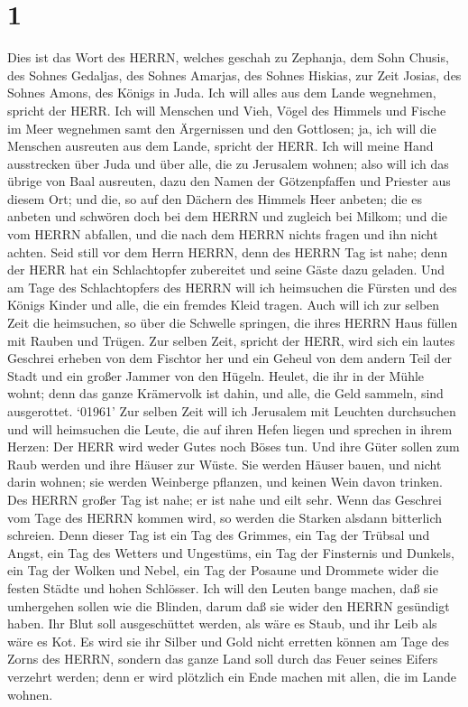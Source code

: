 \hypertarget{section}{%
\section{1}\label{section}}

 Dies ist das Wort des HERRN, welches geschah zu Zephanja,
dem Sohn Chusis, des Sohnes Gedaljas, des Sohnes Amarjas, des Sohnes
Hiskias, zur Zeit Josias, des Sohnes Amons, des Königs in Juda.
 Ich will alles aus dem Lande wegnehmen, spricht der HERR.
 Ich will Menschen und Vieh, Vögel des Himmels und Fische im
Meer wegnehmen samt den Ärgernissen und den Gottlosen; ja, ich will die
Menschen ausreuten aus dem Lande, spricht der HERR.  Ich
will meine Hand ausstrecken über Juda und über alle, die zu Jerusalem
wohnen; also will ich das übrige von Baal ausreuten, dazu den Namen der
Götzenpfaffen und Priester aus diesem Ort;  und die, so auf
den Dächern des Himmels Heer anbeten; die es anbeten und schwören doch
bei dem HERRN und zugleich bei Milkom;  und die vom HERRN
abfallen, und die nach dem HERRN nichts fragen und ihn nicht achten.
 Seid still vor dem Herrn HERRN, denn des HERRN Tag ist
nahe; denn der HERR hat ein Schlachtopfer zubereitet und seine Gäste
dazu geladen.  Und am Tage des Schlachtopfers des HERRN will
ich heimsuchen die Fürsten und des Königs Kinder und alle, die ein
fremdes Kleid tragen.  Auch will ich zur selben Zeit die
heimsuchen, so über die Schwelle springen, die ihres HERRN Haus füllen
mit Rauben und Trügen.  Zur selben Zeit, spricht der HERR,
wird sich ein lautes Geschrei erheben von dem Fischtor her und ein
Geheul von dem andern Teil der Stadt und ein großer Jammer von den
Hügeln.  Heulet, die ihr in der Mühle wohnt; denn das ganze
Krämervolk ist dahin, und alle, die Geld sammeln, sind ausgerottet.
 `01961' Zur selben Zeit will ich Jerusalem mit Leuchten
durchsuchen und will heimsuchen die Leute, die auf ihren Hefen liegen
und sprechen in ihrem Herzen: Der HERR wird weder Gutes noch Böses tun.
 Und ihre Güter sollen zum Raub werden und ihre Häuser zur
Wüste. Sie werden Häuser bauen, und nicht darin wohnen; sie werden
Weinberge pflanzen, und keinen Wein davon trinken.  Des
HERRN großer Tag ist nahe; er ist nahe und eilt sehr. Wenn das Geschrei
vom Tage des HERRN kommen wird, so werden die Starken alsdann bitterlich
schreien.  Denn dieser Tag ist ein Tag des Grimmes, ein Tag
der Trübsal und Angst, ein Tag des Wetters und Ungestüms, ein Tag der
Finsternis und Dunkels, ein Tag der Wolken und Nebel,  ein
Tag der Posaune und Drommete wider die festen Städte und hohen
Schlösser.  Ich will den Leuten bange machen, daß sie
umhergehen sollen wie die Blinden, darum daß sie wider den HERRN
gesündigt haben. Ihr Blut soll ausgeschüttet werden, als wäre es Staub,
und ihr Leib als wäre es Kot.  Es wird sie ihr Silber und
Gold nicht erretten können am Tage des Zorns des HERRN, sondern das
ganze Land soll durch das Feuer seines Eifers verzehrt werden; denn er
wird plötzlich ein Ende machen mit allen, die im Lande wohnen.

